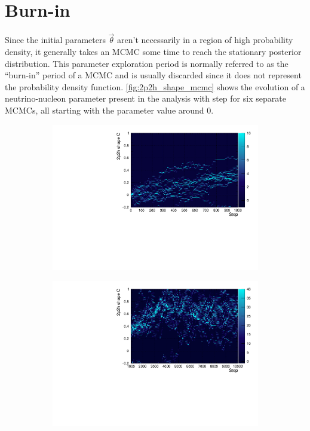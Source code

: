 \section{Burn-in}
Since the initial parameters $\vec{\theta}$ aren't necessarily in a region of high probability density, it generally takes an MCMC some time to reach the stationary posterior distribution. This parameter exploration period is normally referred to as the ``burn-in'' period of a MCMC and is usually discarded since it does not represent the probability density function. \autoref{fig:2p2h_shape_mcmc} shows the evolution of a neutrino-nucleon parameter present in the analysis with step for six separate MCMCs, all starting with the parameter value around 0. 
\begin{figure}[h]
	\begin{subfigure}[t]{0.40\textwidth}
		\includegraphics[width=\textwidth, trim={0mm 0mm 0mm 0mm}, clip,page=1]{figures/mcmc/2p2h_shape_C_step}
	\end{subfigure}
	\begin{subfigure}[t]{0.40\textwidth}
		\includegraphics[width=\textwidth, trim={0mm 0mm 0mm 0mm}, clip,page=1]{figures/mcmc/2p2h_shape_C_step2}
	\end{subfigure}
	

\end{figure}
